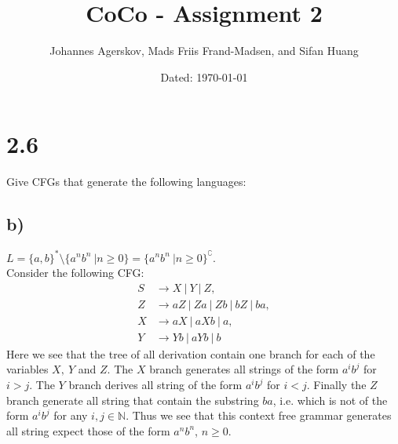 \documentclass[a4paper,11pt]{article}
\author{Johannes Agerskov, Mads Friis Frand-Madsen, and Sifan Huang}
\date{Dated: \today}
\title{CoCo - Assignment 2}
\newcommand{\N}{\mathbb{N}}
\numberwithin{equation}{section}
\begin{document}
	
	\maketitle
	\section*{2.6}
	Give CFGs that generate the following languages:
	\subsection*{b)}
	$ L=\{a,b\}^\ast\setminus\{a^nb^n\ \vert n\geq0\}=\{a^nb^n\ \vert n\geq0\}^{\complement} $.\\
	Consider the following CFG:\begin{equation}
	\begin{aligned}
	S&\to X \ \vert\ Y\ \vert\ Z,\\
	Z&\to aZ\ \vert\ Za\ \vert\ Zb \ \vert\ bZ \ \vert\ ba,\\
	X&\to aX\ \vert\ aXb\ \vert\ a,\\
	Y&\to Yb \ \vert\ aYb \ \vert\ b
	\end{aligned}
	\end{equation}
	Here we see that the tree of all derivation contain one branch for each of the variables $ X,\ Y $ and $ Z $. The $ X $ branch generates all strings of the form $ a^ib^j $ for $ i>j $. The $ Y $ branch derives all string of the form $ a^ib^j $ for $ i<j $. Finally the $ Z $ branch generate all string that contain the substring $ ba $, i.e. which is not of the form $ a^ib^j $ for any $ i,j\in\N $. Thus we see that this context free grammar generates all string expect those of the form $ a^nb^n $, $ n\geq0 $.
\end{document}
